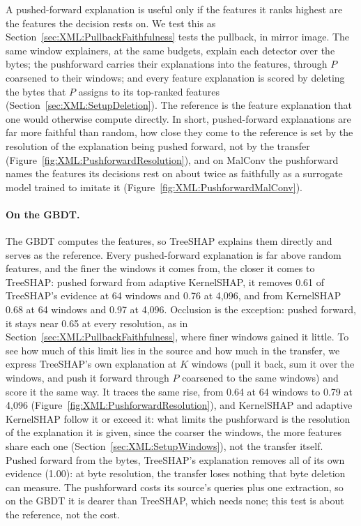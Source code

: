 A pushed-forward explanation is useful only if the features it ranks highest are the features the decision rests on.
We test this as Section~\ref{sec:XML:PullbackFaithfulness} tests the pullback, in mirror image. The same window
explainers, at the same budgets, explain each detector over the bytes; the pushforward carries their explanations into
the features, through $P$ coarsened to their windows; and every feature explanation is scored by deleting the bytes
that $P$ assigns to its top-ranked features (Section~\ref{sec:XML:SetupDeletion}). The reference is the feature
explanation that one would otherwise compute directly. In short, pushed-forward explanations are far more faithful
than random, how close they come to the reference is set by the resolution of the explanation being pushed forward,
not by the transfer (Figure~\ref{fig:XML:PushforwardResolution}), and on MalConv the pushforward names the features its
decisions rest on about twice as faithfully as a surrogate model trained to imitate it
(Figure~\ref{fig:XML:PushforwardMalConv}).

\paragraph{On the GBDT\@.} The GBDT computes the features, so TreeSHAP explains them directly and serves as the
reference. Every pushed-forward explanation is far above random features, and the finer the windows it comes from,
the closer it comes to TreeSHAP: pushed forward from adaptive KernelSHAP, it removes 0.61 of TreeSHAP's
evidence at 64 windows and 0.76 at 4{,}096, and from KernelSHAP 0.68 at 64 windows and 0.97 at 4{,}096. Occlusion is the
exception: pushed forward, it stays near 0.65 at every resolution, as in Section~\ref{sec:XML:PullbackFaithfulness},
where finer windows gained it little. To see how much of this limit lies in the source and how much in the
transfer, we express TreeSHAP's own explanation at $K$ windows (pull it back, sum it over the windows, and push it
forward through $P$ coarsened to the same windows) and score it the same way. It traces the same rise, from 0.64 at 64 windows to 0.79 at 4{,}096
(Figure~\ref{fig:XML:PushforwardResolution}), and KernelSHAP and adaptive KernelSHAP follow it or exceed it: what
limits the pushforward is the resolution of the explanation it is given, since the coarser the windows, the more
features share each one (Section~\ref{sec:XML:SetupWindows}), not the transfer itself. Pushed forward from the bytes,
TreeSHAP's explanation removes all of its own evidence (1.00): at byte resolution, the transfer loses nothing that byte
deletion can measure. The pushforward costs its source's
queries plus one extraction, so on the GBDT it is dearer than TreeSHAP, which needs none; this test is about the
reference, not the cost.

